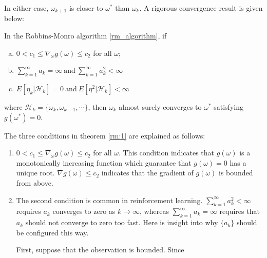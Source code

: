 In either case, $\omega_{k+1}$ is closer to $\omega^{*}$ than $\omega_{k}$. A rigorous convergence result is given below:
\begin{theorem}\label{rm:1}
	In the Robbins-Monro algorithm \ref{rm_algorithm}, if
	\begin{enumerate}[(a)]

		\item $0<c_{1} \le \nabla_{\omega}g(\omega) \le c_{2}$ for all $\omega$;
		\item $\sum_{k=1}^{\infty}a_{k}=\infty \ \text{and} \ \sum_{k=1}^{\infty}a_{k}^{2} < \infty$
		\item $E[\eta_{k}| \mathcal{H}_{k}] = 0 \ \text{and} \ E[\eta^{2}|\mathcal{H}_{k}]<\infty$

	\end{enumerate}
	where $\mathcal{H}_{k}= \{\omega_{k},\omega_{k-1},\cdots \}$, then $\omega_{k}$ almost surely converges to $\omega^{*}$ satisfying $g(\omega^{*})=0$.

\end{theorem}
The three conditions in theorem \ref{rm:1} are explained as follows:
\begin{enumerate}

	\item $0<c_{1} \le \nabla_{\omega}g(\omega) \le c_{2}$ for all $\omega$. This condition indicates that $g(\omega)$ is a monotonically increasing function which guarantee that $g(\omega)=0$ has a unique root. $\nabla g(\omega) \le c_{2}$ indicates that the gradient of $g(\omega)$ is bounded from above.
	\item The second condition is common in reinforcement learning. $\sum_{k=1}^{\infty}a_{k}^{2} < \infty$ requires $a_{k}$ converges to zero as $k \to
		      \infty$, whereas $\sum_{k=1}^{\infty}a_{k}=\infty$ requires that $a_{k}$ should not converge to zero too fast. Here is insight into why
	      $\{a_{k}\}$ should be configured this way.

	      First, suppose that the observation is bounded. Since
	      \begin{equation*}

	      \end{equation*}

\end{enumerate}

